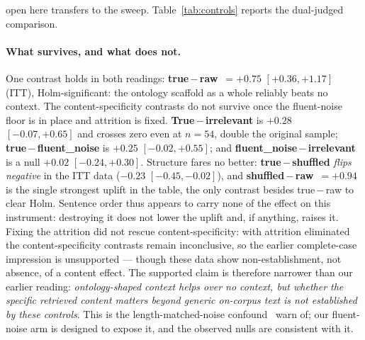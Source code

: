 \documentclass[10pt,twocolumn]{article}
\begin{document}
open here transfers to the sweep. Table~\ref{tab:controls} reports the dual-judged comparison.

\paragraph{What survives, and what does not.} One contrast holds in both readings: \textbf{true\,$-$\,raw}~$=+0.75$ $[+0.36,+1.17]$ (ITT), Holm-significant: the ontology scaffold as a whole reliably beats no context. The content-specificity contrasts do not survive once the fluent-noise floor is in place and attrition is fixed. \textbf{True\,$-$\,irrelevant} is $+0.28$ $[-0.07,+0.65]$ and crosses zero even at $n=54$, double the original sample; \textbf{true\,$-$\,fluent\_noise} is $+0.25$ $[-0.02,+0.55]$; and \textbf{fluent\_noise\,$-$\,irrelevant} is a null $+0.02$ $[-0.24,+0.30]$. Structure fares no better: \textbf{true\,$-$\,shuffled} \emph{flips negative} in the ITT data ($-0.23$ $[-0.45,-0.02]$), and \textbf{shuffled\,$-$\,raw}~$=+0.94$ is the single strongest uplift in the table, the only contrast besides true\,$-$\,raw to clear Holm. Sentence order thus appears to carry none of the effect on this instrument: destroying it does not lower the uplift and, if anything, raises it. Fixing the attrition did not rescue content-specificity: with attrition eliminated the content-specificity contrasts remain inconclusive, so the earlier complete-case impression is unsupported --- though these data show non-establishment, not absence, of a content effect. The supported claim is therefore narrower than our earlier reading: \emph{ontology-shaped context helps over no context, but whether the specific retrieved content matters beyond generic on-corpus text is not established by these controls}. This is the length-matched-noise confound~\textcite{cuconasu2024poweofnoise} warn of; our fluent-noise arm is designed to expose it, and the observed nulls are consistent with it.
\end{document}
